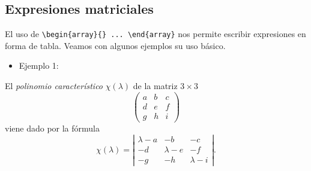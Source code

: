 \documentclass[12pt,a4paper,oneside,]{book}
\providecommand{\tightlist}{%
  \setlength{\itemsep}{0pt}\setlength{\parskip}{0pt}}
\numberwithin{dummy}{section}
\theoremstyle{ocrenumbox}
\theoremstyle{blacknumex}
\theoremstyle{blacknumbox}
\theoremstyle{ocrenum}
\theoremstyle{ocrenum}
\begin{document}
\hypertarget{expresiones-matriciales}{%
\subsection{Expresiones matriciales}\label{expresiones-matriciales}}

El uso de
\texttt{\textbackslash{}begin\{array\}\{\}\ ...\ \textbackslash{}end\{array\}}
nos permite escribir expresiones en forma de tabla. Veamos con algunos
ejemplos su uso básico.

\begin{itemize}
\tightlist
\item
  Ejemplo 1:
\end{itemize}

El \emph{polinomio característico} \(\chi(\lambda)\) de la matriz
\(3 \times 3\) \[ \left( \begin{array}{ccc}
a & b & c \\
d & e & f \\
g & h & i \end{array} \right)\] viene dado por la fórmula \[ 
\chi(\lambda) = 
\left| 
\begin{array}{ccc}
\lambda - a & -b & -c \\
-d & \lambda - e & -f \\
-g & -h & \lambda - i 
\end{array} 
\right|.
\]
\end{document}
